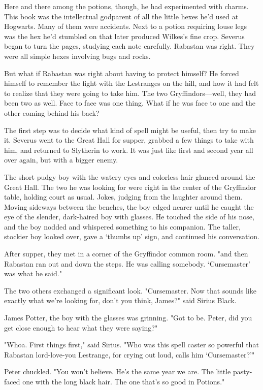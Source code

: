 Here and there among the potions, though, he had experimented with charms. This book was the intellectual godparent of all the little hexes he'd used at Hogwarts. Many of them were accidents. Next to a potion requiring louse legs was the hex he'd stumbled on that later produced Wilkes's fine crop. Severus began to turn the pages, studying each note carefully. Rabastan was right. They were all simple hexes involving bugs and rocks.

But what if Rabastan was right about having to protect himself? He forced himself to remember the fight with the Lestranges on the hill, and how it had felt to realize that they were going to take him. The two Gryffindors—well, they had been two as well. Face to face was one thing. What if he was face to one and the other coming behind his back?

The first step was to decide what kind of spell might be useful, then try to make it. Severus went to the Great Hall for supper, grabbed a few things to take with him, and returned to Slytherin to work. It was just like first and second year all over again, but with a bigger enemy.

The short pudgy boy with the watery eyes and colorless hair glanced around the Great Hall. The two he was looking for were right in the center of the Gryffindor table, holding court as usual. Jokes, judging from the laughter around them. Moving sideways between the benches, the boy edged nearer until he caught the eye of the slender, dark-haired boy with glasses. He touched the side of his nose, and the boy nodded and whispered something to his companion. The taller, stockier boy looked over, gave a `thumbs up' sign, and continued his conversation.

After supper, they met in a corner of the Gryffindor common room. "{\el}and then Rabastan ran out and down the steps. He was calling somebody. `Cursemaster' was what he said."

The two others exchanged a significant look. "Cursemaster. Now that sounds like exactly what we're looking for, don't you think, James?" said Sirius Black.

James Potter, the boy with the glasses was grinning. "Got to be. Peter, did you get close enough to hear what they were saying?"

"Whoa. First things first," said Sirius. "Who was this spell caster so powerful that Rabastan lord-love-you Lestrange, for crying out loud, calls him `Cursemaster?'"

Peter chuckled. "You won't believe. He's the same year we are. The little pasty-faced one with the long black hair. The one that's so good in Potions."

